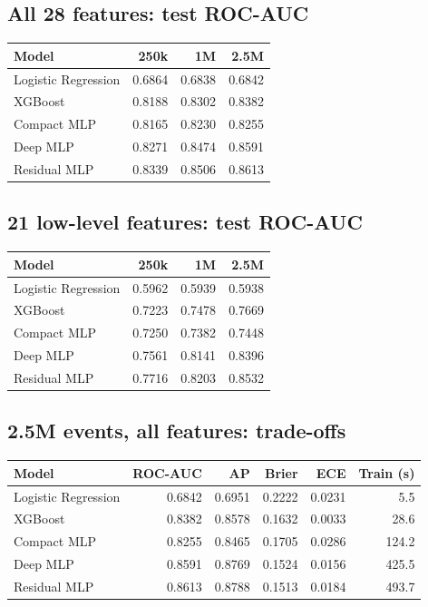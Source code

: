 \subsection*{All 28 features: test ROC-AUC}
\begin{center}\begin{tabular}{lrrr}\toprule
Model & 250k & 1M & 2.5M \\\midrule
Logistic Regression & 0.6864 & 0.6838 & 0.6842 \\
XGBoost & 0.8188 & 0.8302 & 0.8382 \\
Compact MLP & 0.8165 & 0.8230 & 0.8255 \\
Deep MLP & 0.8271 & 0.8474 & 0.8591 \\
Residual MLP & 0.8339 & 0.8506 & 0.8613 \\
\bottomrule\end{tabular}\end{center}
\subsection*{21 low-level features: test ROC-AUC}
\begin{center}\begin{tabular}{lrrr}\toprule
Model & 250k & 1M & 2.5M \\\midrule
Logistic Regression & 0.5962 & 0.5939 & 0.5938 \\
XGBoost & 0.7223 & 0.7478 & 0.7669 \\
Compact MLP & 0.7250 & 0.7382 & 0.7448 \\
Deep MLP & 0.7561 & 0.8141 & 0.8396 \\
Residual MLP & 0.7716 & 0.8203 & 0.8532 \\
\bottomrule\end{tabular}\end{center}
\subsection*{2.5M events, all features: trade-offs}
\begin{center}\small\begin{tabular}{lrrrrr}\toprule
Model & ROC-AUC & AP & Brier & ECE & Train (s) \\\midrule
Logistic Regression & 0.6842 & 0.6951 & 0.2222 & 0.0231 & 5.5 \\
XGBoost & 0.8382 & 0.8578 & 0.1632 & 0.0033 & 28.6 \\
Compact MLP & 0.8255 & 0.8465 & 0.1705 & 0.0286 & 124.2 \\
Deep MLP & 0.8591 & 0.8769 & 0.1524 & 0.0156 & 425.5 \\
Residual MLP & 0.8613 & 0.8788 & 0.1513 & 0.0184 & 493.7 \\
\bottomrule\end{tabular}\end{center}
